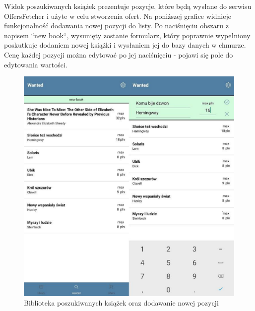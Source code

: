 Widok poszukiwanych książek prezentuje pozycje, które będą wysłane do serwisu OffersFetcher i użyte w celu stworzenia ofert.
Na poniższej grafice widnieje funkcjonalność dodawania nowej pozycji do listy. Po naciśnięciu  obszaru z napisem ``new book``, wysunięty zostanie formularz, który poprawnie wypełniony poskutkuje dodaniem nowej książki i wysłaniem jej do bazy danych w chmurze. Cenę każdej pozycji można edytować po jej naciśnięciu - pojawi się pole do edytowania wartości.
\begin{figure}[H]
	\centering
	\includegraphics[width=\linewidth]{wanted.pdf}
	\caption{Biblioteka poszukiwanych książek oraz dodawanie nowej pozycji}
\end{figure}


